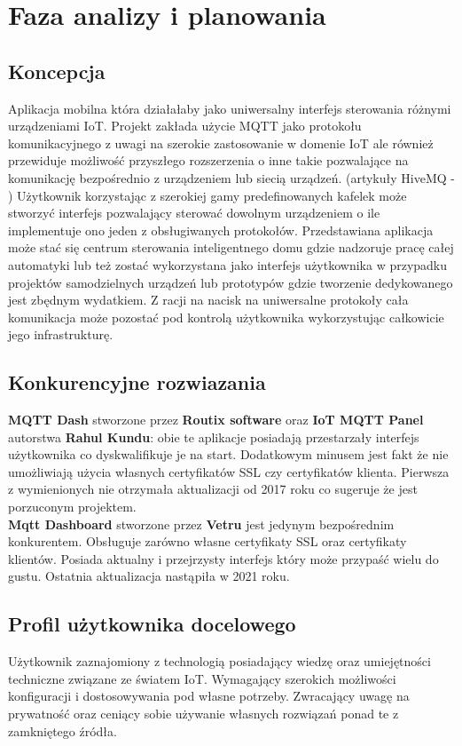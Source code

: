 \section{Faza analizy i planowania}

\subsection{Koncepcja}
Aplikacja mobilna która działałaby jako uniwersalny interfejs sterowania różnymi urządzeniami IoT. Projekt zakłada użycie MQTT jako protokołu komunikacyjnego z uwagi na szerokie zastosowanie w domenie IoT ale również przewiduje możliwość przyszłego rozszerzenia o inne takie pozwalające na komunikację bezpośrednio z urządzeniem lub siecią urządzeń. (artykuły HiveMQ - \cite{mqttincreasedadoption}\cite{mqttadoptionishigh}) Użytkownik korzystając z szerokiej gamy predefinowanych kafelek może stworzyć interfejs pozwalający sterować dowolnym urządzeniem o ile implementuje ono jeden z obsługiwanych protokołów. Przedstawiana aplikacja może stać się centrum sterowania inteligentnego domu gdzie nadzoruje pracę całej automatyki lub też zostać wykorzystana jako interfejs użytkownika w przypadku projektów samodzielnych urządzeń lub prototypów gdzie tworzenie dedykowanego jest zbędnym wydatkiem. Z racji na nacisk na uniwersalne protokoły cała komunikacja może pozostać pod kontrolą użytkownika wykorzystując całkowicie jego infrastrukturę.

\subsection{Konkurencyjne rozwiazania}

\textbf{MQTT Dash} stworzone przez \textbf{Routix software} oraz \textbf{IoT MQTT Panel} autorstwa \textbf{Rahul Kundu}: obie te aplikacje posiadają przestarzały interfejs użytkownika co dyskwalifikuje je na start. Dodatkowym minusem jest fakt że nie umożliwiają użycia własnych certyfikatów SSL czy certyfikatów klienta. Pierwsza z wymienionych nie otrzymała aktualizacji od 2017 roku co sugeruje że jest porzuconym projektem.\\

\textbf{Mqtt Dashboard} stworzone przez \textbf{Vetru} jest jedynym bezpośrednim konkurentem. Obsługuje zarówno własne certyfikaty SSL oraz certyfikaty klientów. Posiada aktualny i przejrzysty interfejs który może przypaść wielu do gustu. Ostatnia aktualizacja nastąpiła w 2021 roku.

\subsection{Profil użytkownika docelowego}
Użytkownik zaznajomiony z technologią posiadający wiedzę oraz umiejętności techniczne związane ze światem IoT. Wymagający szerokich możliwości konfiguracji i dostosowywania pod własne potrzeby. Zwracający uwagę na prywatność oraz ceniący sobie używanie własnych rozwiązań ponad te z zamkniętego źródła.

